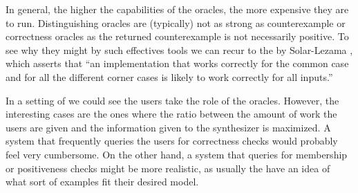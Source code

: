 
In general, the higher the capabilities of the oracles, the more expensive they
are to run. Distinguishing oracles are (typically) not as strong as
counterexample or correctness oracles as the returned counterexample is not
necessarily positive. To see why they might by such effectives tools we can
recur to the   by Solar-Lezama \cite{Solar-Lezama:2008}, which
asserts that ``an implementation that works correctly for the common case and
for all the different corner cases is likely to work correctly for all inputs.''

In a setting of  we could see the
users take the role of the oracles. However, the interesting cases are the ones
where the ratio between the amount of work the users are given and the
information given to the synthesizer is maximized. A system that frequently
queries the users for correctness checks would probably feel very cumbersome. On
the other hand, a system that queries for membership or positiveness checks
might be more realistic, as usually the  have an idea of what sort of examples fit their desired
model.

